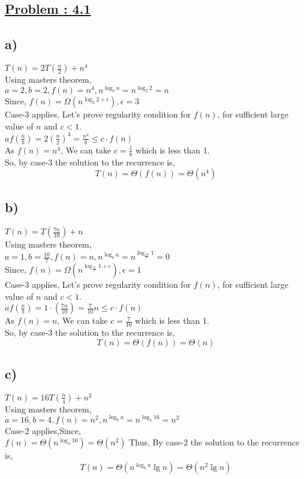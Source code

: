\documentclass[a4paper, 11pt]{article}
\begin{document}
\subsection*{\underline{Problem : 4.1}}
\subsection*{a)}
$T(n) = 2T(\frac{n}{2}) + n^4$\\
Using masters theorem,\\
$a=2, b=2, f(n) = n^4, n^{\log_{b}a}=n^{\log_{2}2}=n$\\
Since, $f(n) = \Omega(n^{\log_{2}2 + \epsilon}), \epsilon=3$\\
Case-3 applies, Let's prove regularity condition for $f(n)$, for sufficient large value of $n$ and $c<1$.\\
$af(\frac{n}{b}) = 2(\frac{n}{2})^4 = \frac{n^4}{8} \le c \cdot f(n)$\\
As $f(n)=n^4$, We can take $c=\frac{1}{8}$ which is less than 1.\\
So, by case-3 the solution to the recurrence is,
$$T(n) = \Theta (f(n)) = \Theta(n^4)$$

\subsection*{b)}
$T(n) = T(\frac{7n}{10}) + n$\\
Using masters theorem,\\
$a=1, b=\frac{10}{7}, f(n) = n, n^{\log_{b}a}=n^{\log_{\frac{10}{7}}1}=0$\\
Since, $f(n) = \Omega(n^{\log_{\frac{10}{7}}1 + \epsilon}), \epsilon=1$\\
Case-3 applies, Let's prove regularity condition for $f(n)$, for sufficient large value of $n$ and $c<1$.\\
$af(\frac{n}{b}) = 1 \cdot(\frac{7n}{10}) = \frac{7}{10}n \le c \cdot f(n)$\\
As $f(n)=n$, We can take $c=\frac{7}{10}$ which is less than 1.\\
So, by case-3 the solution to the recurrence is,
$$T(n) = \Theta (f(n)) = \Theta(n)$$

\subsection*{c)}
$T(n) = 16T(\frac{n}{4}) + n^2$\\
Using masters theorem,\\
$a=16, b=4, f(n) = n^2, n^{\log_{b}a}=n^{\log_{4}16}=n^2$\\
Case-2 applies,Since,\\
$f(n)=\Theta(n^{\log_{4}16}) =\Theta(n^2)$
Thus, By case-2 the solution to the recurrence is,
$$T(n) = \Theta (n^{\log_{b}a} \lg n) = \Theta(n^2 \lg n)$$
\end{document}
